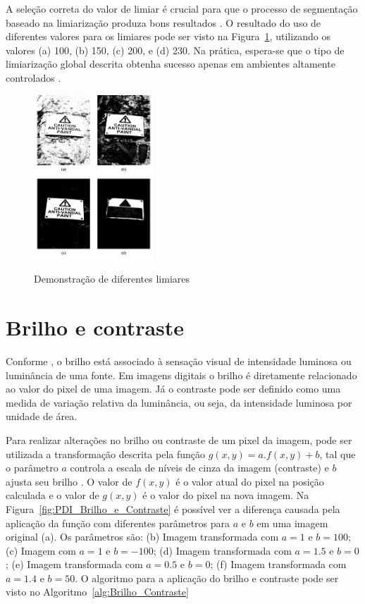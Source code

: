 \documentclass[12pt,oneside,a4paper,english,french,spanish,brazil,]{abntex2}
\begin{document}
A seleção correta do valor de limiar é crucial para que o processo de segmentação baseado na limiarização produza bons resultados \cite{pedrini:2008}. O resultado do uso de diferentes valores para os limiares pode ser visto na Figura~\ref{fig:PDI_Limiarizacao_2}, utilizando os valores (a) 100, (b) 150, (c) 200, e (d) 230. Na prática, espera-se que o tipo de limiarização global descrita obtenha sucesso apenas em ambientes altamente controlados \cite{gonzalez:2012}.

\begin{figure}[ht]
\centering
\caption{Demonstração de diferentes limiares}
\includegraphics[width=0.4\textwidth]{imagens/PDI_Limiarizacao_2.pdf}
\sourceAuthor
\label{fig:PDI_Limiarizacao_2}
\end{figure}

\section{Brilho e contraste}

Conforme \citet{pedrini:2008}, o brilho está associado à sensação visual de intensidade luminosa ou luminância de uma fonte. Em imagens digitais o brilho é diretamente relacionado ao valor do pixel de uma imagem. Já o contraste pode ser definido como uma medida de variação relativa da luminância, ou seja, da intensidade luminosa por unidade de área.

Para realizar alterações no brilho ou contraste de um pixel da imagem, pode ser utilizada a transformação descrita pela função \(g(x,y)=a.f(x,y)+b\), tal que o parâmetro \(a\) controla a escala de níveis de cinza da imagem (contraste) e \(b\) ajusta seu brilho \cite{pedrini:2008}. O valor de \(f(x,y)\) é o valor atual do pixel na posição calculada e o valor de \(g(x,y)\) é o valor do pixel na nova imagem. Na Figura~\ref{fig:PDI_Brilho_e_Contraste} é possível ver a diferença causada pela aplicação da função com diferentes parâmetros para \(a\) e \(b\) \cite{pedrini:2008} em uma imagem original (a). Os parâmetros são: (b) Imagem transformada com \(a=1\) e \(b=100\); (c) Imagem com \(a=1\) e \(b=-100\); (d) Imagem transformada com \(a=1.5\) e \(b=0\); (e) Imagem transformada com \(a=0.5\) e \(b=0\); (f) Imagem transformada com \(a=1.4\) e \(b=50\). O algoritmo para a aplicação do brilho e contraste pode ser visto no Algoritmo~\ref{alg:Brilho_Contraste} 
\end{document}
